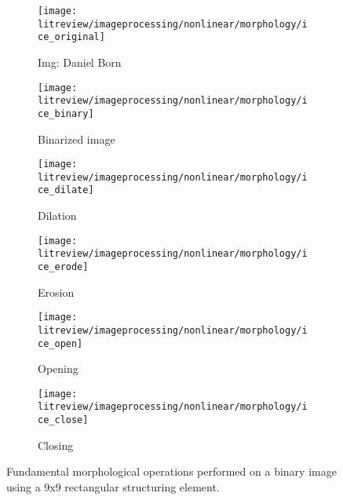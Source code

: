 \renewcommand{\arraystretch}{0.6} %
\begin{figure}[H]
    \centering
    \begin{subfigure}[b]{0.49\textwidth}
        \texttt{[image: litreview/imageprocessing/nonlinear/morphology/ice\_original]}
        \caption{Img: Daniel Born}
        \label{fig:ice}
    \end{subfigure}
    \begin{subfigure}[b]{0.49\textwidth}
        \texttt{[image: litreview/imageprocessing/nonlinear/morphology/ice\_binary]}
        \caption{Binarized image}
        \label{fig:ice_binary}
    \end{subfigure}
    \begin{subfigure}[b]{0.49\textwidth}
        \texttt{[image: litreview/imageprocessing/nonlinear/morphology/ice\_dilate]}
        \caption{Dilation}
        \label{fig:ice_dilation}
    \end{subfigure}
    \begin{subfigure}[b]{0.49\textwidth}
        \texttt{[image: litreview/imageprocessing/nonlinear/morphology/ice\_erode]}
        \caption{Erosion}
        \label{fig:ice_erosion}
    \end{subfigure}
    \begin{subfigure}[b]{0.49\textwidth}
        \texttt{[image: litreview/imageprocessing/nonlinear/morphology/ice\_open]}
        \caption{Opening}
        \label{fig:ice_open}
    \end{subfigure} 
    \begin{subfigure}[b]{0.49\textwidth}
        \texttt{[image: litreview/imageprocessing/nonlinear/morphology/ice\_close]}
        \caption{Closing}
        \label{fig:ice_close}
    \end{subfigure} 
    \captionsetup{format = hang}
    \caption{Fundamental morphological  operations performed on a binary image using a 9x9 rectangular structuring element.}
    \label{fig:morphology}
  \end{figure}


